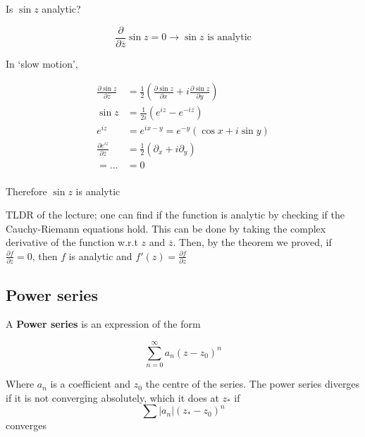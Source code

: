 \documentclass[../notes.tex]{subfiles}
\begin{document}
\begin{example}
	Is $ \sin z$ analytic?

	\begin{equation}
		\frac{\partial }{\partial \overline{z}} \sin z = 0 \rightarrow \sin z \text{ is analytic}
	\end{equation}

	In `slow motion',

	\begin{equation}
		\begin{split}
			\frac{\partial \sin z}{\partial \overline{z}}  &= \frac{1}{2} \left( \frac{\partial \sin z}{\partial x} + i \frac{\partial \sin z}{\partial y}  \right)   \\
			 \sin z&= \frac{1}{2i} \left( e^{iz} - e^{-iz} \right)   \\
			 e^{iz} &= e^{ix-y} = e^{-y} (\cos x + i \sin y) \\
			 \frac{\partial e^{iz}}{\partial \overline{z}} &= \frac{1}{2} (\partial_x + i \partial_y) \\
			 = \ldots &= 0 \\
		\end{split}
	\end{equation}

	Therefore $ \sin z $ is analytic
	
\end{example}


TLDR of the lecture; one can find if the function is analytic by checking if the Cauchy-Riemann equations hold. This can be done by taking the complex derivative of the function w.r.t $ z $ and $ \overline{z} $. Then, by the theorem we proved, if $ \frac{\partial f}{\partial \overline{z}} = 0  $, then $ f $ is analytic and $ f'(z) = \frac{\partial f}{\partial z}  $ 

\subsection{Power series}

\begin{definition}
	A \textbf{Power series} is an expression of the form

	\begin{equation}
		\sum^{\infty}_{n=0} a_n (z-z_0)^n
	\end{equation}

	Where $ a_n $ is a coefficient and $ z_0 $ the centre of the series.
	The power series diverges if it is not converging absolutely, which it does at $ z_*  $ if \begin{equation}
		\sum |a_n| (z_* - z_0)^n
	\end{equation}
	converges
	
\end{definition}
\end{document}
